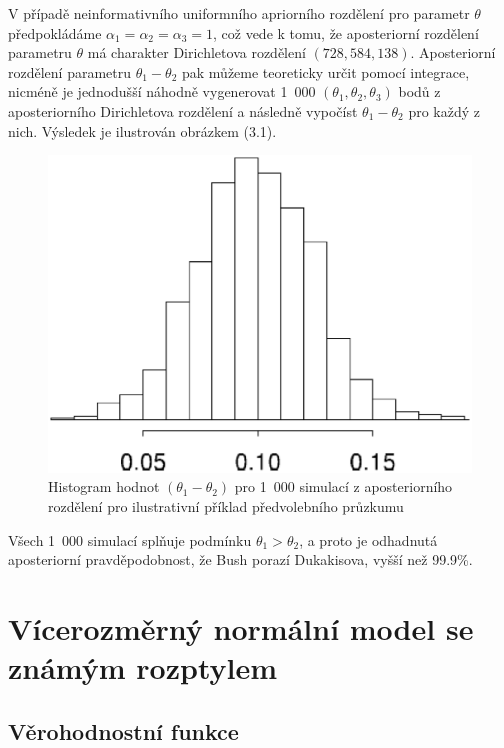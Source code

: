 V případě neinformativního uniformního apriorního rozdělení pro parametr $\theta$ předpokládáme $\alpha_1 = \alpha_2 = \alpha_3 = 1$, což vede k tomu, že aposteriorní rozdělení parametru $\theta$ má charakter Dirichletova rozdělení $(728, 584, 138)$. Aposteriorní rozdělení parametru $\theta_1 - \theta_2$ pak můžeme teoreticky určit pomocí integrace, nicméně je jednodušší náhodně vygenerovat 1~000 $(\theta_1, \theta_2, \theta_3)$ bodů z aposteriorního Dirichletova rozdělení a následně vypočíst $\theta_1 - \theta_2$ pro každý z nich. Výsledek je ilustrován obrázkem (3.1). 
\begin{figure}[htp]
\centering
\includegraphics[scale = 0.45]{pictures/fig_3_2.eps}
\caption{Histogram hodnot $(\theta_1 - \theta_2)$ pro 1~000 simulací z aposteriorního rozdělení pro ilustrativní příklad předvolebního průzkumu}
\label{fig_2_1}
\end{figure}
Všech 1~000 simulací splňuje podmínku $\theta_1 > \theta_2$, a proto je odhadnutá aposteriorní pravděpodobnost, že Bush porazí Dukakisova, vyšší než 99.9\%.

\section{Vícerozměrný normální model se známým rozptylem}

\subsection{Věrohodnostní funkce}

